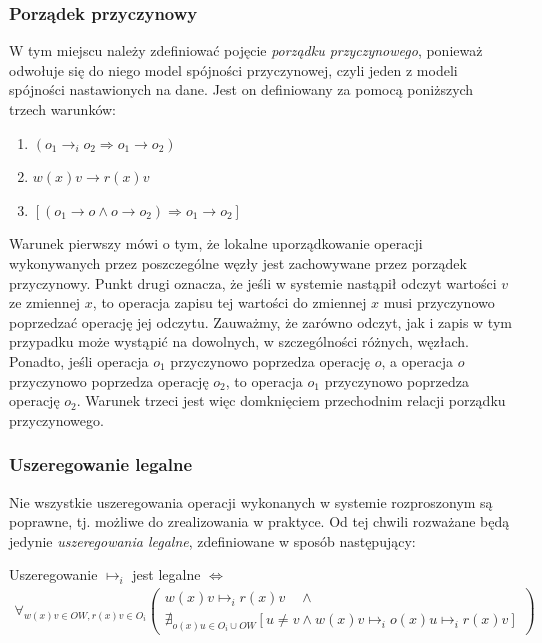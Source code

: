 \subsubsection{Porządek przyczynowy} \label{section:causal_order}

W tym miejscu należy zdefiniować pojęcie \textit{porządku przyczynowego}, ponieważ odwołuje się do niego model spójności przyczynowej, czyli jeden z modeli spójności nastawionych na dane. Jest on definiowany za pomocą poniższych trzech warunków:
\begin{enumerate}
    \item{ 
        $ (o_1 \rightarrow_i o_2 \Rightarrow o_1 \rightarrow o_2) $ }
    \item{
        $ w(x)v \rightarrow r(x)v $ }
    \item{
        $[(o_1 \rightarrow o \wedge o \rightarrow o_2) \Rightarrow o_1 \rightarrow o_2] $ }
\end{enumerate}
Warunek pierwszy mówi o tym, że lokalne uporządkowanie operacji wykonywanych przez poszczególne węzły jest zachowywane przez porządek przyczynowy. Punkt drugi oznacza, że jeśli w systemie nastąpił odczyt wartości $ v $ ze zmiennej $ x $, to operacja zapisu tej wartości do zmiennej $ x $ musi przyczynowo poprzedzać operację jej odczytu. Zauważmy, że zarówno odczyt, jak i zapis w tym przypadku może wystąpić na dowolnych, w szczególności różnych, węzłach. Ponadto, jeśli operacja $ o_1 $ przyczynowo poprzedza operację $ o $, a operacja $ o $ przyczynowo poprzedza operację $ o_2 $, to operacja $ o_1 $ przyczynowo poprzedza operację $ o_2 $. Warunek trzeci jest więc domknięciem przechodnim relacji porządku przyczynowego.

\subsubsection{Uszeregowanie legalne}

Nie wszystkie uszeregowania operacji wykonanych w systemie rozproszonym są poprawne, tj. możliwe do zrealizowania w praktyce. Od tej chwili rozważane będą jedynie \textit{uszeregowania legalne}, zdefiniowane w sposób następujący:

Uszeregowanie $ \mapsto_i $ jest legalne $ \Leftrightarrow $
\begin{align*}
    \forall_{w(x)v \in OW, r(x)v \in O_i}
    \left(
    \begin{array}{lr}
         w(x)v \mapsto_i r(x)v \quad \wedge \\
         \nexists_{o(x)u \in O_i \cup OW} [u \neq v \wedge w(x)v \mapsto_i o(x)u \mapsto_i r(x)v]
    \end{array}\right)
\end{align*}

